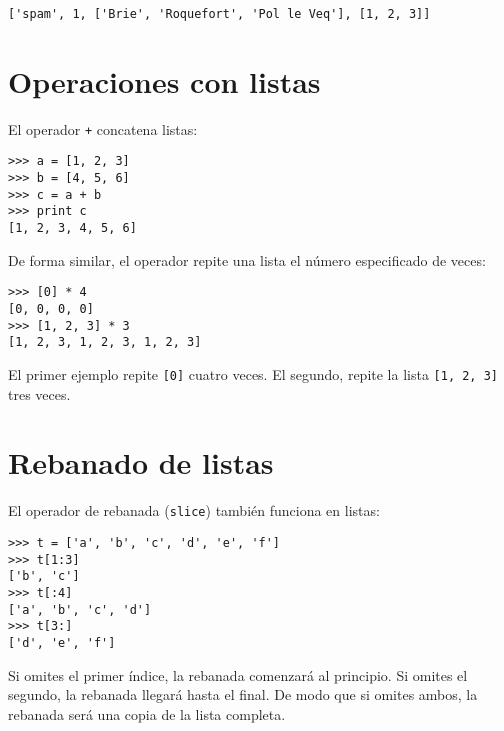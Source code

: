 
\beforeverb
\begin{verbatim}
['spam', 1, ['Brie', 'Roquefort', 'Pol le Veq'], [1, 2, 3]]
\end{verbatim}
\afterverb



\section{Operaciones con listas}

El operador {\tt +} concatena listas:


\beforeverb
\begin{verbatim}
>>> a = [1, 2, 3]
>>> b = [4, 5, 6]
>>> c = a + b
>>> print c
[1, 2, 3, 4, 5, 6]
\end{verbatim}
\afterverb
%
De forma similar, el operador {\tt *} repite una lista el número especificado de veces:


\beforeverb
\begin{verbatim}
>>> [0] * 4
[0, 0, 0, 0]
>>> [1, 2, 3] * 3
[1, 2, 3, 1, 2, 3, 1, 2, 3]
\end{verbatim}
\afterverb
%
El primer ejemplo repite {\tt [0]} cuatro veces. El segundo,
repite la lista {\tt [1, 2, 3]} tres veces.


\section{Rebanado de listas}


El operador de rebanada ({\tt slice}) también funciona en listas:

\beforeverb
\begin{verbatim}
>>> t = ['a', 'b', 'c', 'd', 'e', 'f']
>>> t[1:3]
['b', 'c']
>>> t[:4]
['a', 'b', 'c', 'd']
>>> t[3:]
['d', 'e', 'f']
\end{verbatim}
\afterverb
%
Si omites el primer índice, la rebanada comenzará al principio.
Si omites el segundo, la rebanada llegará hasta el final. De modo que
si omites ambos, la rebanada será una copia de la lista completa.

